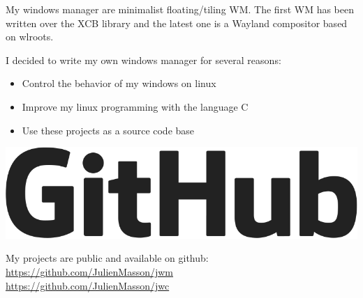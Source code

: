 \documentclass[letterpaper]{jm-cv} %
\begin{document}
\medskip
{}
\medskip

{\large{\color{maingray}\bullet}}

My windows manager are minimalist floating/tiling WM. The first WM has been written over the XCB library and the latest one is a Wayland compositor based on wlroots.

\begin{minipage}{.7\textwidth}
  I decided to write my own windows manager for several reasons:
  \begin{itemize}
  \item[\color{mainblue}\faArrowRight] Control the behavior of my windows on linux
  \item[\color{mainblue}\faArrowRight] Improve my linux programming with the language C
  \item[\color{mainblue}\faArrowRight] Use these projects as a source code base
  \end{itemize}
\end{minipage}%
\begin{minipage}{.3\textwidth}
  \center
  \includegraphics[scale=0.10]{logo-github.png}
\end{minipage}
\vspace{0.2cm}

My projects are public and available on github:\\
\href{https://github.com/JulienMasson/jwm}{https://github.com/JulienMasson/jwm}\\
\href{https://github.com/JulienMasson/jwm}{https://github.com/JulienMasson/jwc}
\end{document}
